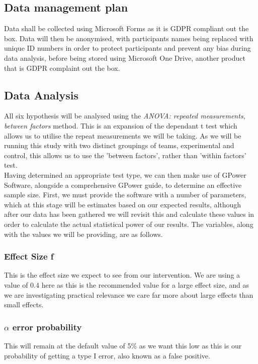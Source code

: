\documentclass[lettersize,journal]{IEEEtran}
\begin{document}
    \subsection{Data management plan}
        Data shall be collected using Microsoft Forms as it is GDPR compliant out the box. Data will then be anonymised, with participants names being replaced with unique ID numbers in order to protect participants and prevent any bias during data analysis, before being stored using Microsoft One Drive, another product that is GDPR complaint out the box.
    
    \subsection{Data Analysis}
        All six hypothesis will be analysed using the \textit{ANOVA: repeated measurements, between factors} method. This is an expansion of the dependant t test\cite{carvadiaANOVA} which allows us to utilise the repeat measurements we will be taking. As we will be running this study with two distinct groupings of teams, experimental and control, this allows us to use the 'between factors', rather than 'within factors' test\cite{carvadiaANOVA}. \\
        Having determined an appropriate test type, we can then make use of GPower Software\cite{faul2007g,faul2009statistical}, alongside a comprehensive GPower guide\cite{gpowerguide}, to determine an effective sample size. First, we must provide the software with a number of parameters, which at this stage will be estimates based on our expected results, although after our data has been gathered we will revisit this and calculate these values in order to calculate the actual statistical power of our results. The variables, along with the values we will be providing, are as follows.\\

        \subsubsection*{Effect Size f}
            This is the effect size we expect to see from our intervention. We are using a value of 0.4 here as this is the recommended value for a large effect size\cite{cohen1992power}, and as we are investigating practical relevance we care far more about large effects than small effects.\\

        \subsubsection*{$\alpha$ error probability}
            This will remain at the default value of 5\% as we want this low as this is our probability of getting a type I error, also known as a false positive\cite{errortype}.\\
\end{document}
